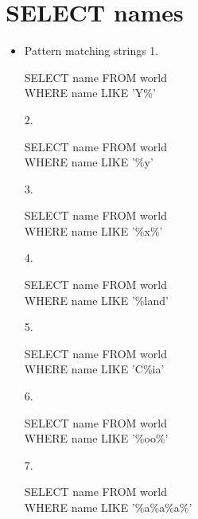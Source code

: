 \documentclass[10pt, oneside]{article}
\begin{document}
\section{SELECT names}
\begin{itemize}
	\item Pattern matching strings
	1.
	\begin{center}
		\begin{minipage}{.6\linewidth}
			SELECT name FROM world \\
			WHERE name LIKE 'Y\%'
		\end{minipage}
	\end{center}
	2.
	\begin{center}
		\begin{minipage}{.6\linewidth}
			SELECT name FROM world\\
			WHERE name LIKE '\%y'
		\end{minipage}
	\end{center}
	3.
	\begin{center}
		\begin{minipage}{.6\linewidth}
			SELECT name FROM world \\
			WHERE name LIKE '\%x\%'
		\end{minipage}
	\end{center}
	4.
	\begin{center}
		\begin{minipage}{.6\linewidth}
			SELECT name FROM world\\
			WHERE name LIKE '\%land'
		\end{minipage}
	\end{center}
	5.
	\begin{center}
		\begin{minipage}{.6\linewidth}
			SELECT name FROM world \\
			WHERE name LIKE 'C\%ia'
		\end{minipage}
	\end{center}
	6.
	\begin{center}
		\begin{minipage}{.6\linewidth}
			SELECT name FROM world \\
			WHERE name LIKE '\%oo\%'
		\end{minipage}
	\end{center}
	7.
	\begin{center}
		\begin{minipage}{.6\linewidth}
			SELECT name FROM world \\
			WHERE name LIKE '\%a\%a\%a\%'
		\end{minipage}

\end{center}
\end{itemize}
\end{document}
